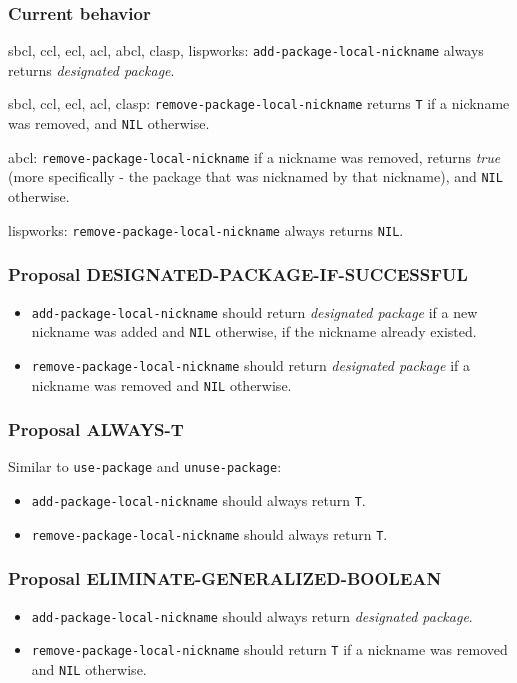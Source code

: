 \documentclass[11pt]{article}
\begin{document}
\subsubsection{Current behavior}
\label{sec:orga96fc07}
sbcl, ccl, ecl, acl, abcl, clasp, lispworks:
  \texttt{add-package-local-nickname} always returns \emph{designated package}.

sbcl, ccl, ecl, acl, clasp:
  \texttt{remove-package-local-nickname} returns \texttt{T} if a nickname was removed,
  and \texttt{NIL} otherwise.

abcl:
  \texttt{remove-package-local-nickname} if a nickname was removed, returns \emph{true} (more
  specifically - the package that was nicknamed by that nickname), and \texttt{NIL}
  otherwise.

lispworks:
  \texttt{remove-package-local-nickname} always returns \texttt{NIL}.
\subsubsection{Proposal DESIGNATED-PACKAGE-IF-SUCCESSFUL}
\label{sec:orgdfa9235}
\begin{itemize}
\item \texttt{add-package-local-nickname} should return \emph{designated package} if a new nickname
was added and \texttt{NIL} otherwise, if the nickname already existed.
\item \texttt{remove-package-local-nickname} should return \emph{designated package} if a nickname
was removed and \texttt{NIL} otherwise.
\end{itemize}
\subsubsection{Proposal ALWAYS-T}
\label{sec:org5f8e5b6}
Similar to \texttt{use-package} and \texttt{unuse-package}:
\begin{itemize}
\item \texttt{add-package-local-nickname} should always return \texttt{T}.
\item \texttt{remove-package-local-nickname} should always return \texttt{T}.
\end{itemize}
\subsubsection{Proposal ELIMINATE-GENERALIZED-BOOLEAN}
\label{sec:org667c7e9}
\begin{itemize}
\item \texttt{add-package-local-nickname} should always return \emph{designated package}.
\item \texttt{remove-package-local-nickname} should return \texttt{T} if a nickname was removed and
\texttt{NIL} otherwise.
\end{itemize}
\end{document}
